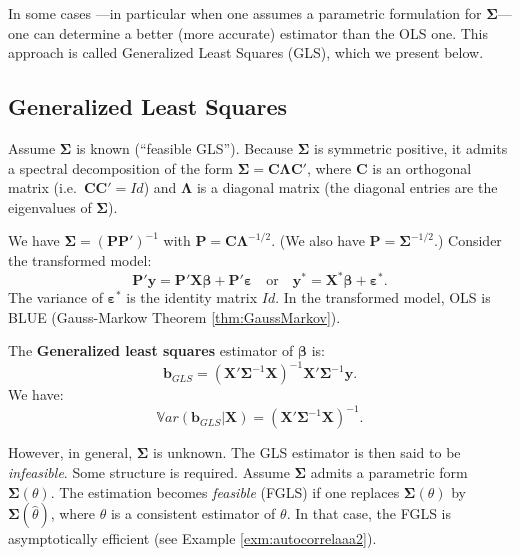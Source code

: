 \documentclass[
  12pt,
]{book}
\theoremstyle{definition}
\theoremstyle{definition}
\theoremstyle{definition}
\theoremstyle{definition}
\theoremstyle{remark}
\begin{document}
In some cases ---in particular when one assumes a parametric formulation for \(\boldsymbol\Sigma\)--- one can determine a better (more accurate) estimator than the OLS one. This approach is called Generalized Least Squares (GLS), which we present below.

\hypertarget{GLS}{%
\subsection{Generalized Least Squares}\label{GLS}}

Assume \(\boldsymbol\Sigma\) is known (``feasible GLS''). Because \(\boldsymbol\Sigma\) is symmetric positive, it admits a spectral decomposition of the form \(\boldsymbol\Sigma = \mathbf{C} \boldsymbol\Lambda \mathbf{C}'\), where \(\mathbf{C}\) is an orthogonal matrix (i.e.~\(\mathbf{C}\mathbf{C}'=Id\)) and \(\boldsymbol\Lambda\) is a diagonal matrix (the diagonal entries are the eigenvalues of \(\boldsymbol\Sigma\)).

We have \(\boldsymbol\Sigma = (\mathbf{P}\mathbf{P}')^{-1}\) with \(\mathbf{P} = \mathbf{C}\boldsymbol\Lambda^{-1/2}\). (We also have \(\mathbf{P}=\boldsymbol\Sigma^{-1/2}\).) Consider the transformed model:
\[
\mathbf{P}'\mathbf{y} = \mathbf{P}'\mathbf{X}\boldsymbol\beta + \mathbf{P}'\boldsymbol\varepsilon \quad \mbox{or} \quad \mathbf{y}^* = \mathbf{X}^*\boldsymbol\beta + \boldsymbol\varepsilon^*.
\]
The variance of \(\boldsymbol\varepsilon^*\) is the identity matrix \(Id\). In the transformed model, OLS is BLUE (Gauss-Markow Theorem \ref{thm:GaussMarkov}).

The \textbf{Generalized least squares} estimator of \(\boldsymbol\beta\) is:
\begin{equation}
\boxed{\mathbf{b}_{GLS} = (\mathbf{X}'\boldsymbol\Sigma^{-1}\mathbf{X})^{-1}\mathbf{X}'\boldsymbol\Sigma^{-1}\mathbf{y}.}\label{eq:betaGLS}
\end{equation}
We have:
\[
\mathbb{V}ar(\mathbf{b}_{GLS}|\mathbf{X}) = (\mathbf{X}'\boldsymbol\Sigma^{-1}\mathbf{X})^{-1}.
\]

However, in general, \(\boldsymbol\Sigma\) is unknown. The GLS estimator is then said to be \emph{infeasible}. Some structure is required. Assume \(\boldsymbol\Sigma\) admits a parametric form \(\boldsymbol\Sigma(\theta)\). The estimation becomes \emph{feasible} (FGLS) if one replaces \(\boldsymbol\Sigma(\theta)\) by \(\boldsymbol\Sigma(\hat\theta)\), where \(\hat\theta\) is a consistent estimator of \(\theta\). In that case, the FGLS is asymptotically efficient (see Example \ref{exm:autocorrelaaa2}).
\end{document}
